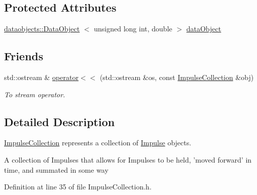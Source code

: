 \subsection*{\-Protected \-Attributes}
\begin{DoxyCompactItemize}
\item 
\hyperlink{classcryomesh_1_1dataobjects_1_1DataObject}{dataobjects\-::\-Data\-Object}\*
$<$ unsigned long int, double $>$ \hyperlink{classcryomesh_1_1dataobjects_1_1DataObjectController_aa13d30e9fa2f1caa0510635214d4bb26}{data\-Object}
\end{DoxyCompactItemize}
\subsection*{\-Friends}
\begin{DoxyCompactItemize}
\item 
std\-::ostream \& \hyperlink{classcryomesh_1_1components_1_1ImpulseCollection_a7c219e0c7bb5a54301e5655d28f8a81b}{operator$<$$<$} (std\-::ostream \&os, const \hyperlink{classcryomesh_1_1components_1_1ImpulseCollection}{\-Impulse\-Collection} \&obj)
\begin{DoxyCompactList}\small\item\em \-To stream operator. \end{DoxyCompactList}\end{DoxyCompactItemize}


\subsection{\-Detailed \-Description}
\hyperlink{classcryomesh_1_1components_1_1ImpulseCollection}{\-Impulse\-Collection} represents a collection of \hyperlink{classcryomesh_1_1components_1_1Impulse}{\-Impulse} objects. 

\-A collection of \-Impulses that allows for \-Impulses to be held, 'moved forward' in time, and summated in some way 

\-Definition at line 35 of file \-Impulse\-Collection.\-h.



